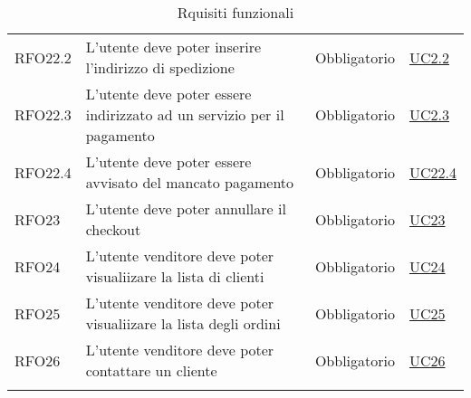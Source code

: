 \begin{center}
\begin{longtable}[!h]{p{50px} p{200px} p{100px} p{50px}}
        RFO22.2                               & L'utente deve poter inserire l'indirizzo di spedizione                                           & Obbligatorio             & \hyperref[sec:UC22]{UC2.2}    \\
        RFO22.3                               & L'utente deve poter essere indirizzato ad un servizio per il pagamento                           & Obbligatorio             & \hyperref[sec:UC22.3]{UC2.3}  \\
        RFO22.4                               & L'utente deve poter essere avvisato del mancato pagamento                                        & Obbligatorio             & \hyperref[sec:UC22.4]{UC22.4} \\
        RFO23                                 & L'utente deve poter annullare il checkout                                                        & Obbligatorio             & \hyperref[sec:UC23]{UC23}     \\
        RFO24                                 & L'utente venditore deve poter visualiizare la lista di clienti                                   & Obbligatorio             & \hyperref[sec:UC24]{UC24}     \\
        RFO25                                 & L'utente venditore deve poter visualiizare la lista degli ordini                                 & Obbligatorio             & \hyperref[sec:UC25]{UC25}     \\
        RFO26                                 & L'utente venditore deve poter contattare un cliente                                              & Obbligatorio             & \hyperref[sec:UC26]{UC26}     \\
        \rowcolor{white}\caption{Rquisiti funzionali}
    \end{longtable}
\end{center}
